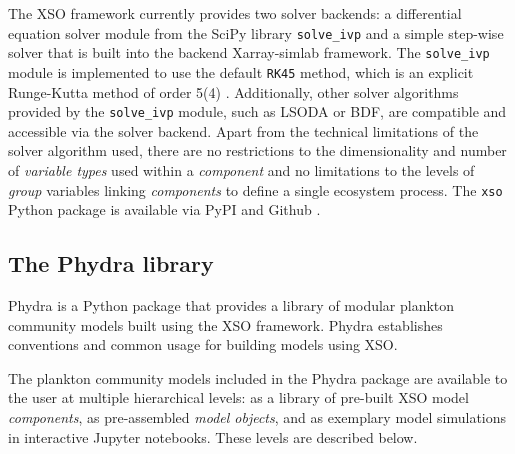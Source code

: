 \documentclass[gmd, manuscript]{copernicus}
\begin{document}
The XSO framework currently provides two solver backends: a differential equation solver module from the SciPy library \texttt{solve\_ivp} \citep{Virtanen2020SciPyPython} and a simple step-wise solver that is built into the backend Xarray-simlab framework. 
The \texttt{solve\_ivp} module is implemented to use the default \texttt{RK45} method, which is an explicit Runge-Kutta method of order 5(4) \citep{Dormand1980AFormulae}. Additionally, other solver algorithms provided by the \texttt{solve\_ivp} module, such as LSODA or BDF, are compatible and accessible via the solver backend. Apart from the technical limitations of the solver algorithm used, there are no restrictions to the dimensionality and number of \textit{variable types} used within a \textit{component} and no limitations to the levels of \textit{group} variables linking \textit{components} to define a single ecosystem process. The \texttt{xso} Python package is available via PyPI and Github \citep{Post2023Xarray-simlab-ODE}.

\subsection{The Phydra library} \label{Section:PhydraLibrary}
Phydra is a Python package that provides a library of modular plankton community models built using the XSO framework. Phydra establishes conventions and common usage for building models using XSO.

The plankton community models included in the Phydra package are available to the user at multiple hierarchical levels: as a library of pre-built XSO model \textit{components}, as pre-assembled \textit{model objects}, and as exemplary model simulations in interactive Jupyter notebooks. These levels are described below.
\end{document}
